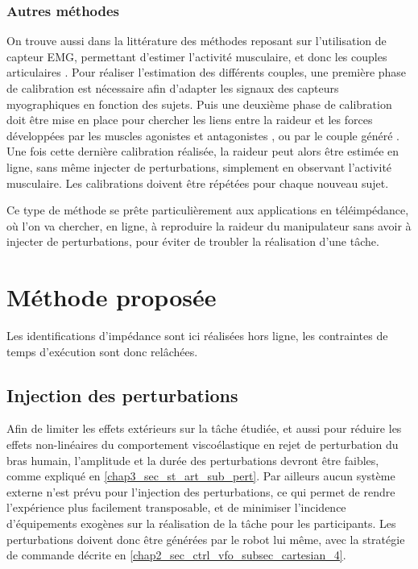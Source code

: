 \subsubsection{Autres méthodes} \label{chap3_sec_st_art_sub_ident_3}

On trouve aussi dans la littérature des méthodes reposant sur l'utilisation de capteur EMG, permettant d'estimer l'activité musculaire, et donc les couples articulaires \parencite{ajoudani_tele-impedance:_2011,castellini_semg-based_2014,wang_semg-based_2017}. Pour réaliser l'estimation des différents couples, une première phase de calibration est nécessaire afin d'adapter les signaux des capteurs myographiques en fonction des sujets. Puis une deuxième phase de calibration doit être mise en place pour chercher les liens entre la raideur et les forces développées par les muscles agonistes et antagonistes \parencite{ajoudani_tele-impedance:_2011}, ou par le couple généré \parencite{castellini_semg-based_2014}. Une fois cette dernière calibration réalisée, la raideur peut alors être estimée en ligne, sans même injecter de perturbations, simplement en observant l'activité musculaire. Les calibrations doivent être répétées pour chaque nouveau sujet. 

Ce type de méthode se prête particulièrement aux applications en téléimpédance, où l'on va chercher, en ligne, à reproduire la raideur du manipulateur sans avoir à injecter de perturbations, pour éviter de troubler la réalisation d'une tâche. 

\section{Méthode proposée} \label{chap3_sec_method}

Les identifications d'impédance sont ici réalisées hors ligne, les contraintes de temps d'exécution sont donc relâchées.

\subsection{Injection des perturbations} \label{chap3_sec_method_sub_pert}

Afin de limiter les effets extérieurs sur la tâche étudiée, et aussi pour réduire les effets non-linéaires du comportement viscoélastique en rejet de perturbation du bras humain, l'amplitude et la durée des perturbations devront être faibles, comme expliqué en \cref{chap3_sec_st_art_sub_pert}. Par ailleurs aucun système externe n'est prévu pour l'injection des perturbations, ce qui permet de rendre l'expérience plus facilement transposable, et de minimiser l'incidence d'équipements exogènes sur la réalisation de la tâche pour les participants. Les perturbations doivent donc être générées par le robot lui même, avec la stratégie de commande décrite en \cref{chap2_sec_ctrl_vfo_subsec_cartesian_4}.

